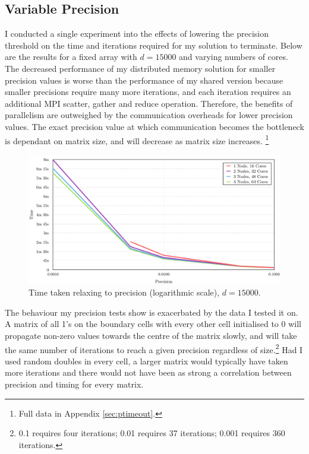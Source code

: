 \documentclass[12pt]{article}
\begin{document}
\subsection{Variable Precision}
I conducted a single experiment into the effects of lowering the precision threshold on the time and iterations required for my solution to terminate. Below are the results for a fixed array with $d=15000$ and varying numbers of cores. The decreased performance of my distributed memory solution for smaller precision values is worse than the performance of my shared version because smaller precisions require many more iterations, and each iteration requires an additional MPI scatter, gather and reduce operation. Therefore, the benefits of parallelism are outweighed by the communication overheads for lower precision values. The exact precision value at which communication becomes the bottleneck is dependant on matrix size, and will decrease as matrix size increases. \footnote{Full data in Appendix \ref{sec:ptimeout}.}

\begin{figure}[htbp!]
	\includegraphics[width=\textwidth]{img/precision.pdf}
	\caption{Time taken relaxing to precision (logarithmic scale), $d=15000$.}
	\label{fig:precision}
\end{figure}

The behaviour my precision tests show is exacerbated by the data I tested it on. A matrix of all 1's on the boundary cells with every other cell initialised to 0 will propagate non-zero values towards the centre of the matrix slowly, and will take the same number of iterations to reach a given precision regardless of size.\footnote{0.1 requires four iterations; 0.01 requires 37 iterations; 0.001 requires 360 iterations.} 
Had I used random doubles in every cell, a larger matrix would typically have taken more iterations and there would not have been as strong a correlation between precision and timing for every matrix.
\end{document}

